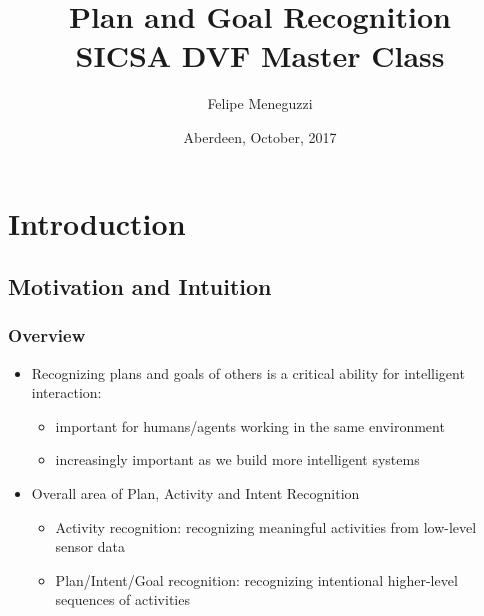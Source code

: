 \documentclass{beamer}
\title[\fontsize{0.08cm}{1em}\selectfont Plan and Goal Recognition]{Plan and Goal Recognition \\ SICSA DVF Master Class}
\author[Meneguzzi]{Felipe Meneguzzi\dag
}
\institute[]{\dag Pontifical Catholic University of Rio Grande do Sul, Brazil
\\
\url{felipe.meneguzzi@pucrs.br}
}
\date{Aberdeen, October, 2017}
\begin{document}

    \begin{frame}
        \titlepage
    \end{frame}
    
\section{Introduction}

\subsection[Test]{Motivation and Intuition}

	\begin{frame}[c]\frametitle{Overview}
		\begin{itemize}
			\item Recognizing plans and goals of others is a critical ability for intelligent interaction:
			\begin{itemize}
				\item important for humans/agents working in the same environment
				\item increasingly important as we build more intelligent systems
			\end{itemize}
			\item Overall area of Plan, Activity and Intent Recognition
			\begin{itemize}
				\item Activity recognition: recognizing meaningful activities from low-level sensor data
				\item Plan/Intent/Goal recognition: recognizing intentional higher-level sequences of activities 
			\end{itemize}
		\end{itemize}
	\end{frame}
\end{document}
